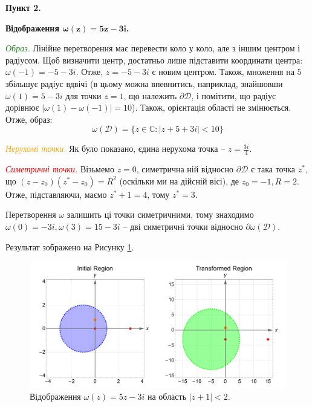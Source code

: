 \documentclass[oneside,solution]{karazin-complan-assign}
\begin{document}
\vspace{10px}
\textbf{Пункт 2.}

\textbf{Відображення $\boldsymbol{\omega(z)=5z-3i}$.}

\textcolor{ForestGreen}{\textit{Образ.}} Лінійне перетворення має перевести коло у коло, але з іншим центром і радіусом. Щоб визначити центр, достатньо лише підставити координати центра: $\omega(-1) = -5-3i$. Отже, $z=-5-3i$ є новим центром. Також, множення на $5$ збільшує радіус вдвічі (в цьому можна впевнитись, наприклад, знайшовши $\omega(1) = 5-3i$ для точки $z=1$, що належить $\partial\mathcal{D}$, і помітити, що радіус дорівнює $|\omega(1)-\omega(-1)|=10$). Також, орієнтація області не змінюється. Отже, образ:
\begin{equation}
    \omega(\mathcal{D}) = \{z \in \mathbb{C}: |z+5+3i| < 10\}
\end{equation}

\textcolor{orange}{\textit{Нерухомі точки.}} Як було показано, єдина нерухома точка -- $z=\frac{3i}{4}$.

\textcolor{red}{\textit{Симетричні точки.}} Візьмемо $z=0$, симетрична ній відносно $\partial\mathcal{D}$ є така точка $z^*$, що $(z-z_0)(z^*-z_0) = R^2$ (оскільки ми на дійсній вісі), де $z_0=-1,R=2$. Отже, підставляючи, маємо $z^*+1=4$, тому $z^*=3$.

Перетворення $\omega$ залишить ці точки симетричними, тому знаходимо $\omega(0)=-3i, \omega(3)=15-3i$ -- дві симетричні точки відносно $\partial\omega(\mathcal{D})$.

Результат зображено на Рисунку \ref{fig:2(a)}.

\begin{figure}
    \centering
    \includegraphics[width=\textwidth]{images/hw_4/problem_2(a).pdf}
    \caption{Відображення $\omega(z)=5z-3i$ на область $|z+1|<2$.}
    \label{fig:2(a)}
\end{figure}
\end{document}
